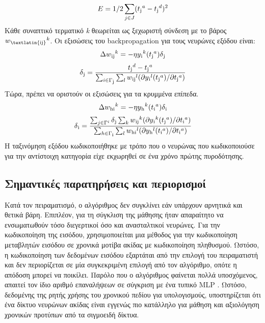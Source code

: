 \documentclass[12pt]{report}
\begin{document}
\begin{equation}
    E=1/2\sum_{j\in J}(t\textsubscript{j}^a-t\textsubscript{j}^d)^2
\end{equation}
Κάθε συναπτικό τερματικό \textit{\textlatin{k}} θεωρείται ως ξεχωριστή σύνδεση με το βάρος \(w\textsubscript{\textlatin{ij}}^k\). Οι εξισώσεις του \textlatin{backpropagation} για τους νευρώνες εξόδου είναι:
\begin{equation}
    \Delta w\textsubscript{ij}^k=-\eta y\textsubscript{i}^k (t\textsubscript{j}^a) \delta \textsubscript{j}
\end{equation}
\begin{equation}
\delta \textsubscript{j} = \frac { t\textsubscript{j}^d-t\textsubscript{j}^a}  {\sum_{i \in \Gamma \textsubscript{j} } \sum_{l} w \textsubscript{ij}^l(\partial y \textsubscript{i}^l(t \textsubscript{j}^a) / \partial t \textsubscript{j}^a)}
\end{equation}
Τώρα, πρέπει να οριστούν οι εξισώσεις για τα κρυμμένα επίπεδα.
\begin{equation}
    \Delta w\textsubscript{hi}^k=-\eta y\textsubscript{h}^k (t\textsubscript{i}^a) \delta \textsubscript{i}
\end{equation}
\begin{equation}
\delta \textsubscript{i} = \frac { \sum_{j \in \Gamma^i  }\delta\textsubscript{j}\sum_{k} w \textsubscript{ij}^k(\partial y \textsubscript{i}^k(t \textsubscript{j}^a) / \partial t \textsubscript{i}^a)}
{ \sum_{h \in \Gamma \textsubscript{i} }\sum_{l} w \textsubscript{hi}^l(\partial y \textsubscript{h}^l(t \textsubscript{i}^a) / \partial t \textsubscript{i}^a)}
\end{equation}
Η ταξινόμηση εξόδου κωδικοποιήθηκε με τρόπο που ο νευρώνας που κωδικοποιούσε για την αντίστοιχη κατηγορία είχε εκχωρηθεί σε ένα χρόνο πρώτης πυροδότησης.

\subsection{Σημαντικές παρατηρήσεις και περιορισμοί}

Κατά τον πειραματισμό, ο αλγόριθμος δεν συγκλίνει εάν υπάρχουν αρνητικά και θετικά βάρη. Επιπλέον, για τη σύγκλιση της μάθησης ήταν απαραίτητο να ενσωματωθούν τόσο διεγερτικοί όσο και ανασταλτικοί νευρώνες. Για την κωδικοποίηση της εισόδου, χρησιμοποιείται μια μέθοδος για την κωδικοποίηση μεταβλητών εισόδου σε χρονικά μοτίβα ακίδας με κωδικοποίηση πληθυσμού. Ωστόσο, η κωδικοποίηση των δεδομένων εισόδου εξαρτάται από την επιλογή του πειραματιστή και δεν περιορίζεται σε μία συγκεκριμένη επιλογή από τον αλγόριθμο, οπότε η απόδοση μπορεί να ποικίλει. Παρόλο που ο αλγόριθμος φαίνεται πολλά υποσχόμενος, απαιτεί τον ίδιο αριθμό επαναλήψεων σε σύγκριση με ένα τυπικό \textlatin{MLP} . Ωστόσο, δεδομένης της ρητής χρήσης του χρονικού πεδίου για υπολογισμούς, υποστηρίζεται ότι ένα δίκτυο νευρώνων ακίδας είναι εγγενώς πιο κατάλληλο για μάθηση και αξιολόγηση χρονικών προτύπων από τα σιγμοειδή δίκτυα.
\end{document}
